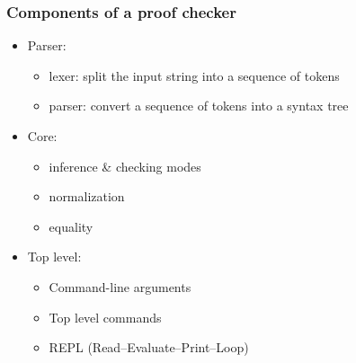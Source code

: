 \documentclass[10pt,aspectratio=169]{beamer}
\begin{document}
\begin{frame}
  \frametitle{Components of a proof checker}

  \begin{itemize}
  \item Parser:
    \begin{itemize}
    \item lexer: split the input string into a sequence of tokens
    \item parser: convert a sequence of tokens into a syntax tree
    \end{itemize}
  \item Core:
    \begin{itemize}
    \item inference \& checking modes
    \item normalization
    \item equality
    \end{itemize}
  \item Top level:
    \begin{itemize}
    \item Command-line arguments
    \item Top level commands
    \item REPL (Read--Evaluate--Print--Loop)
    \end{itemize}
  \end{itemize}



\end{frame}
\end{document}

